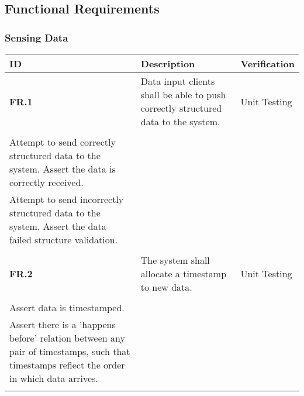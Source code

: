 \subsection{Functional Requirements}
\subsubsection{Sensing Data}
\begin{table}
    \begin{tabular}{lll}
    \textbf{ID}   & \textbf{Description}                                                              & \textbf{Verification}                                                                                                                                                                                                                                              \\ \hline
    \textbf{FR.1} & Data input clients shall be able to push correctly structured data to the system. & Unit Testing\\\begin{itemize}\\\item Attempt to send correctly structured data to the system. Assert the data is correctly received.\\\item Attempt to send incorrectly structured data to the system. Assert the data failed structure validation.\\\end{itemize} \\
    \textbf{FR.2} & The system shall allocate a timestamp to new data.                                & Unit Testing\\\begin{itemize}\\\item Assert data is timestamped.\\\item Assert there is a ’happens before’ relation between any pair of timestamps, such that timestamps reflect the order in which data arrives.\\\end{itemize}                                   \\
	\end{tabular}
\end{table}
